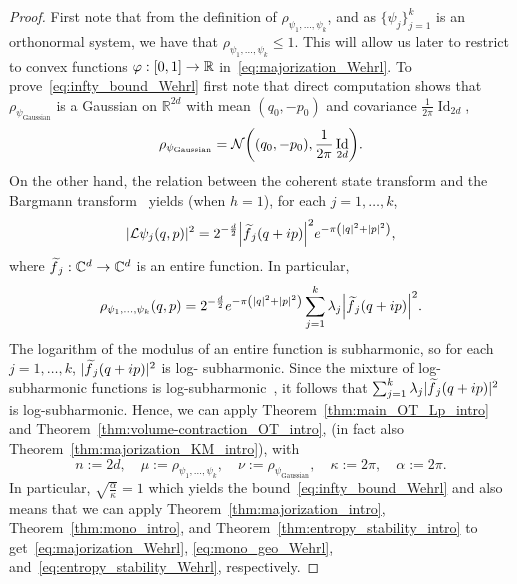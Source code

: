\documentclass[AHL,Unicode,longabstracts]{cedram}
\newcommand{\R}{\mathbb R}
\newcommand{\C}{\mathbb C}
\DeclareMathOperator{\Id}{Id}
\newcommand{\dd}{n}
\newcommand{\prob}{\rho}
\newcommand{\source}{\mu}
\newcommand{\target}{\nu}
\newcommand{\lsh}{\alpha}
\newcommand{\lc}{\kappa}
\newcommand{\cotrans}{\mathcal L}
\newcommand{\clN}{\mathcal{N}}
\newcommand{\wave}{\psi}
\newcommand{\waveg}{\psi_{\mathrm{Gaussian}}}
\newcommand{\cxfun}{\varphi}
\renewcommand*{\to}{\mathchoice{\longrightarrow}{\rightarrow}{\rightarrow}{\rightarrow}}
\let\originalleft\left
\let\originalright\right
\renewcommand{\left}{\mathopen{}\mathclose\bgroup\originalleft}
\renewcommand{\right}{\aftergroup\egroup\originalright}
\let\oldtilde\tilde
\renewcommand*{\tilde}[1]{\mathchoice{\widetilde{#1}}{\widetilde{#1}}{\oldtilde{#1}}{\oldtilde{#1}}}
\begin{document}
\begin{proof}
First note that from the definition of $\prob_{\wave_1,\ldots,\wave_k}$, and as $\{\wave_j\}_{j=1}^k$ is an orthonormal system, we have that $\prob_{\wave_1,\ldots,\wave_k}\le 1$. This will allow us later to restrict to convex functions $\cxfun:[0,1]\to \R$ in~\eqref{eq:majorization_Wehrl}. To prove~\eqref{eq:infty_bound_Wehrl} first note that direct computation shows that $\prob_{\waveg}$ is a Gaussian on $\R^{2d}$ with mean $(q_0,-p_0)$ and covariance $\frac{1}{2\pi}\Id_{2d}$,
\[
\prob_{\waveg}=\clN\left((q_0,-p_0),\frac{1}{2\pi}\Id_{2d}\right).
\]
On the other hand, the relation between the coherent state transform and the Bargmann transform~\cite[Proposition~3.4.1]{grochenig2001foundations} yields (when $h=1$), for each $j=1,\ldots,k$,
\begin{equation}\label{eq:STFT_Bargmann_j}
|\cotrans\wave_j(q,p)|^2=2^{-\frac{d}{2}}\left|\tilde f_j(q+ip)\right|^2e^{-\pi\left(|q|^2+|p|^2\right)},
\end{equation}
where $\tilde f_j:\C^{d}\to \C^{d}$ is an entire function. In particular,
\begin{equation}\label{eq:STFT_Bargmann}
\prob_{\wave_1,\ldots,\wave_k}(q,p)=2^{-\frac{d}{2}}e^{-\pi\left(|q|^2+|p|^2\right)}\sum_{j=1}^k\lambda_j\left|\tilde f_j(q+ip)\right|^2.
\end{equation}
The logarithm of the modulus of an entire function is subharmonic, so for each $j=1,\ldots, k$, $\lvert\tilde f_j(q+ip)\rvert^2$ is log- subharmonic. Since the mixture of log-subharmonic fun\-ctions is log-subharmonic~\cite[Proposition~2.2]{MR2578455}, it follows that $\sum_{j=1}^k\lambda_j\lvert\tilde f_j(q+ip)\rvert^2$ is log-subharmonic. Hence, we can apply Theorem~\ref{thm:main_OT_Lp_intro} and Theorem~\ref{thm:volume-contraction_OT_intro}, (in fact also Theorem~\ref{thm:majorization_KM_intro}), with
\[
\dd:=2d,\quad \source:=\prob_{\wave_1,\ldots,\wave_k},\quad\target:=\prob_{\waveg},\quad \lc:=2\pi,\quad \lsh:=2\pi.
\]
In particular, $\sqrt{ \frac{\lsh}{\lc}}=1$ which yields the bound~\eqref{eq:infty_bound_Wehrl} and also means that we can apply Theorem~\ref{thm:majorization_intro}, Theorem~\ref{thm:mono_intro}, and Theorem~\ref{thm:entropy_stability_intro} to get~\eqref{eq:majorization_Wehrl}, \eqref{eq:mono_geo_Wehrl}, and~\eqref{eq:entropy_stability_Wehrl}, respectively.
\end{proof}
\end{document}
